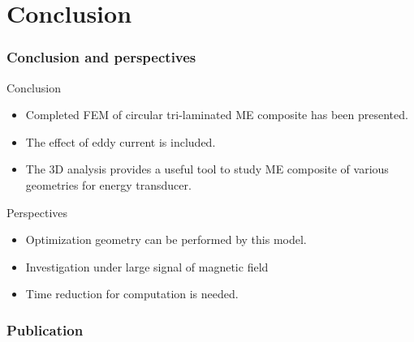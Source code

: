 \documentclass[compress]{beamer}
\begin{document}
\section{Conclusion}
\begin{frame}\frametitle{Conclusion and perspectives}
\begin{block}{Conclusion}
\begin{itemize}
\item Completed FEM of circular tri-laminated ME composite has been presented.
\item The effect of eddy current is included.
\item The 3D analysis provides a useful tool to study ME composite of various geometries for energy transducer.
\end{itemize}
\end{block}
\begin{exampleblock}{Perspectives}
\begin{itemize}
\item Optimization geometry can be performed by this model.
\item Investigation under large signal of magnetic field 
\item Time reduction for computation is needed.
\end{itemize}
\end{exampleblock}
\end{frame}


\begin{frame}\frametitle{Publication}






\end{frame}

%        
%        
\end{document}
